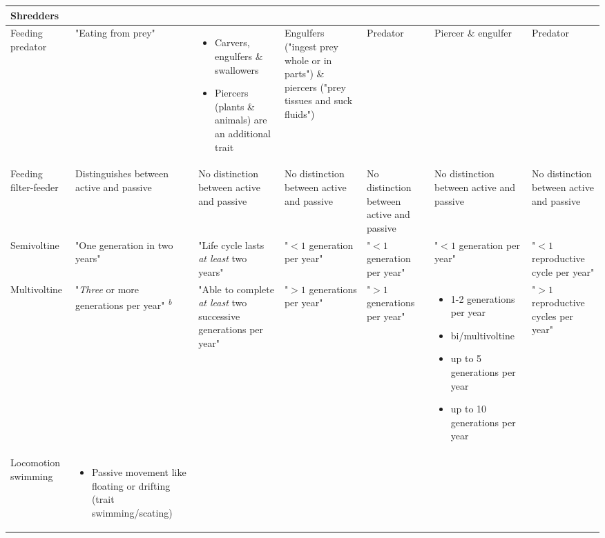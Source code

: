 \documentclass[../Draft_harmonization_paper.tex]{subfiles}
\begin{document}
\begin{landscape}
\begin{longtable}{m{1.8cm}|m{3cm}|m{3cm}|m{3cm}|m{3cm}|m{3.2cm}|m{3cm}}
        Shredders
        \\ 
        \midrule
        Feeding predator & 
        "Eating from prey" & 
        \begin{itemize}
            \item Carvers, engulfers \& swallowers
            \item Piercers (plants \& animals) are an additional trait
        \end{itemize} & %
        Engulfers ("ingest prey whole or in parts") \& 
        piercers ("prey tissues and suck fluids") & 
        Predator &
        Piercer \& engulfer &
        Predator
        \\ 
        \midrule
        Feeding filter-feeder & 
        Distinguishes between active and passive &
        No distinction between active and passive &
        No distinction between active and passive &
        No distinction between active and passive &
        No distinction between active and passive &
        No distinction between active and passive
        \\
        \toprule[.1em]
        Semivoltine & 
        "One generation in two years" & 
        "Life cycle lasts \textit{at least} two years" & 
        "$< 1$ generation per year" & 
        "$< 1$ generation per year" & 
        "$< 1$ generation per year" & 
        "$< 1$ reproductive cycle per year"
        \\
        \midrule
        Multivoltine & 
        "\textit{Three} or more generations per year" \textsuperscript{\textit{b}}& 
        "Able to complete \textit{at least} two successive generations per year" &
        "$> 1$ generations per year" &
        "$> 1$ generations per year" & 
        \begin{itemize}
            \item 1-2 generations per year
            \item bi/multivoltine
            \item up to 5 generations per year
            \item up to 10 generations per year
        \end{itemize}
        & 
        "$> 1$ reproductive cycles per year"
        \\
        \toprule[.1em]
        Locomotion swimming & 
        \begin{itemize}
            \item Passive movement like floating or drifting (trait swimming/scating)

\end{itemize}
\end{longtable}
\end{landscape}
\end{document}
